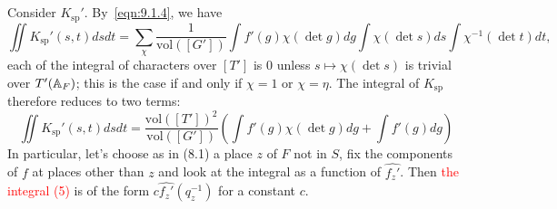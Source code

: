 \subsection{}
Consider $K_{\mathrm{sp}}'$.
By~\eqref{eqn:9.1.4}, we have
\begin{equation}
    \iint K_{\mathrm{sp}}'(s, t)dsdt = \sum_{\chi} \frac{1}{\mathrm{vol}([G'])} \int f'(g) \chi(\det g) dg \int \chi(\det s) ds \int \chi^{-1}(\det t) dt,
\end{equation}
each of the integral of characters over $[T']$ is 0 unless $s\mapsto \chi(\det s)$ is trivial over $T'(\mathbb{A}_F) $; 
this is the case if and only if $\chi=1$ or $\chi=\eta$.
The integral of $K_{\mathrm{sp}}$ therefore reduces to two terms:
\begin{equation}
    \iint K_{\mathrm{sp}}'(s, t) dsdt = \frac{\mathrm{vol}([T'])^2}{\mathrm{vol}([G'])} \left(\int f'(g)\chi(\det g)dg + \int f'(g) dg\right)
\end{equation}
In particular, let's choose as in (8.1) a place $z$ of $F$ not in $S$, fix the components of $f$ at places other than $z$ and look at the integral as a function of $\hat{f_z'}$.
Then \textcolor{red}{the integral (5)} is of the form $c \hat{f_z'}(q_{z}^{-1})$ for a constant $c$.



